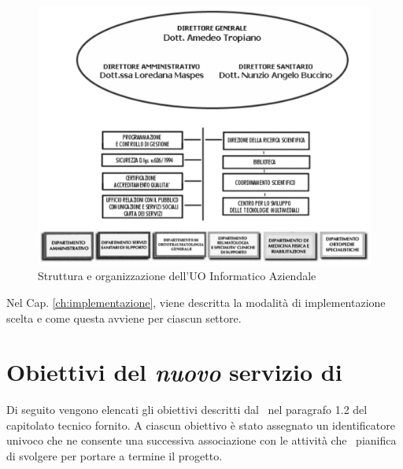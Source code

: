 		\begin{figure}[h!]
			\centering
			\includegraphics[width=\linewidth]{img/gerarchia.png}
			\caption{Struttura e organizzazione dell'UO Informatico Aziendale}
			\label{fig:gerarchia}
		\end{figure}

		Nel Cap. \ref{ch:implementazione}, viene descritta la modalità di implementazione scelta e come questa avviene per ciascun settore.
		
%
%	

\newpage
\section{Obiettivi del \textit{nuovo} servizio di \helpdesk}\label{sec:obiettivi_helpdesk}

	
	Di seguito vengono elencati gli obiettivi descritti dal \proponente~nel paragrafo 1.2 del capitolato tecnico fornito.
	A ciascun obiettivo è stato assegnato un identificatore univoco che ne consente una successiva associazione con le attività che \azienda~pianifica di svolgere per portare a termine il progetto.
	
